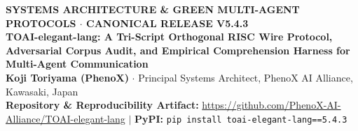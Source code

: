 \documentclass[9pt,a4paper]{extarticle}
\begin{document}
\begin{center}
  {\footnotesize\sffamily\bfseries\color{tealrule} SYSTEMS ARCHITECTURE \& GREEN MULTI-AGENT PROTOCOLS $\cdot$ CANONICAL RELEASE V5.4.3}\\[2pt]
  {\Large\bfseries\sffamily\color{navyheader} TOAI-elegant-lang: A Tri-Script Orthogonal RISC Wire Protocol, Adversarial Corpus Audit, and Empirical Comprehension Harness for Multi-Agent Communication}\\[3pt]
  {\normalsize\bfseries Koji Toriyama (PhenoX)} $\cdot$ {\small Principal Systems Architect, PhenoX AI Alliance, Kawasaki, Japan}\\
  {\footnotesize\sffamily\bfseries Repository \& Reproducibility Artifact:} {\footnotesize\url{https://github.com/PhenoX-AI-Alliance/TOAI-elegant-lang} $|$ \textbf{PyPI:} \texttt{pip install toai-elegant-lang==5.4.3}}
\end{center}
\end{document}
